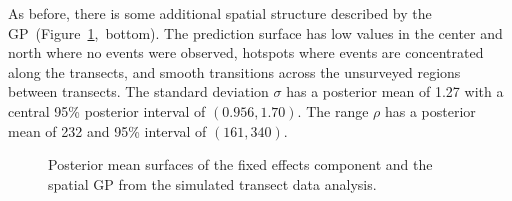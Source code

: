 \documentclass[]{interact}
\begin{document}
As before, there is some additional spatial structure described by the
GP~(Figure~\ref{effortmean},~bottom). The prediction surface has low values
in the center and north where no events were observed, hotspots where events
are concentrated along the transects, and smooth transitions across the
unsurveyed regions between transects. The standard deviation \(\sigma\) has a
posterior mean of 1.27 with a central 95\% posterior interval of
\((0.956, 1.70)\). The range \(\rho\) has a posterior mean of 232 and
95\% interval of \((161, 340)\).

\begin{figure}[h!]


\caption{Posterior mean surfaces of the fixed effects component and the
spatial GP from the simulated transect data analysis.}
\label{effortmean}
\end{figure}
\end{document}
